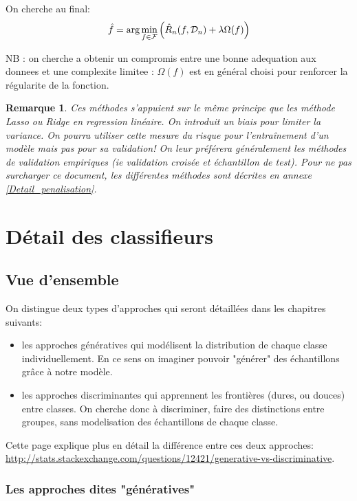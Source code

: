 \documentclass[a4paper]{article}
\theoremstyle{plain}
\newtheorem*{remark*}{Remarque}
\begin{document}
On cherche au final: $$ \hat f = {\rm arg} \displaystyle\min_{f \in \mathcal{F}} \left( \hat R_n(f, \mathcal{D}_n) + \lambda \Omega(f) \right)$$

NB : on cherche a obtenir un compromis entre une bonne adequation aux donnees et une complexite limitee : $\Omega(f)$ est en
général choisi pour renforcer la régularite de la fonction.\\

\begin{remark*} Ces méthodes s'appuient sur le même principe que les méthode Lasso ou Ridge en regression linéaire. On introduit un biais pour limiter la variance. On pourra utiliser cette mesure du risque pour l'entraînement d'un modèle mais pas pour sa validation! On leur préférera généralement les méthodes de validation empiriques (ie validation croisée et échantillon de test). Pour ne pas surcharger ce document, les différentes méthodes sont décrites en annexe \ref{Detail_penalisation}. 
 \end{remark*}
 





\pagebreak
\section{Détail des classifieurs}

\subsection{Vue d'ensemble}

On distingue deux types d'approches qui seront détaillées dans les chapitres suivants:
\begin{itemize}
\item les approches génératives qui modélisent la distribution de chaque classe individuellement. En ce sens on imaginer pouvoir "générer" des échantillons grâce à notre modèle.
\item les approches discriminantes qui apprennent les frontières (dures, ou douces) entre classes. On cherche donc à discriminer, faire des distinctions entre groupes, sans modelisation des échantillons de chaque classe.
\end{itemize}

Cette page explique plus en détail la différence entre ces deux approches: \url{http://stats.stackexchange.com/questions/12421/generative-vs-discriminative}.

\subsubsection{Les approches dites "génératives"}
\end{document}
